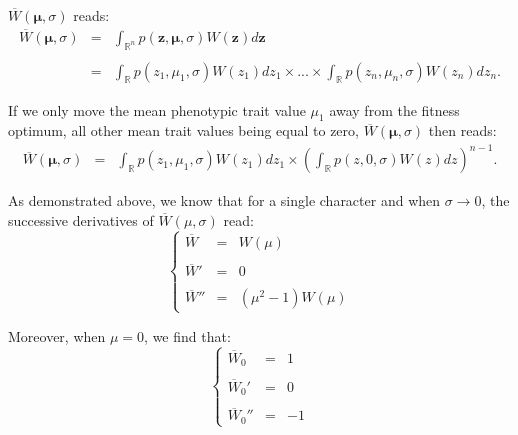 $\overline{W}(\boldsymbol{\mu}, \sigma)$ reads:
\begin{equation}
\begin{array}{rcl}
\overline{W}(\boldsymbol{\mu}, \sigma) & = & \displaystyle\int_{\mathbb{R}^n} p(\boldsymbol{z},\boldsymbol{\mu},\sigma)W(\boldsymbol{z})d\boldsymbol{z}\\\\
& = & \displaystyle\int_{\mathbb{R}} p(z_1,\mu_1,\sigma)W(z_1)dz_1 \times ... \times \displaystyle\int_{\mathbb{R}} p(z_n,\mu_n,\sigma)W(z_n)dz_n.
\end{array}
\end{equation}

If we only move the mean phenotypic trait value $\mu_1$ away from the fitness optimum, all other mean trait values being equal to zero, $\overline{W}(\boldsymbol{\mu}, \sigma)$ then reads:
\begin{equation}
\begin{array}{rcl}
\overline{W}(\boldsymbol{\mu}, \sigma) & = & \displaystyle\int_{\mathbb{R}} p(z_1,\mu_1,\sigma)W(z_1)dz_1 \times \left( \displaystyle\int_{\mathbb{R}} p(z,0,\sigma)W(z)dz \right)^{n-1}.
\end{array}
\end{equation}

As demonstrated above, we know that for a single character and when $\sigma \rightarrow 0$, the successive derivatives of $\overline{W}(\mu, \sigma)$ read:
\begin{equation}
\left\{
\begin{array}{ccl}
\overline{W} & = & W(\mu)\\\\
\overline{W}' & = & 0\\\\
\overline{W}'' & = & (\mu^2-1)W(\mu)
\end{array}
\right.
\label{eq:part1:derivative1}
\end{equation}

Moreover, when $\mu = 0$, we find that:
\begin{equation}
\left\{
\begin{array}{ccl}
\overline{W}_0 & = & 1\\\\
\overline{W}_0' & = & 0\\\\
\overline{W}_0'' & = & -1
\end{array}
\right.
\label{eq:part1:derivative2}
\end{equation}

